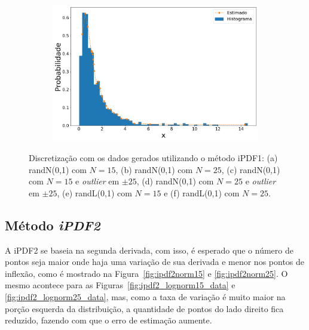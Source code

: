 \begin{figure}[H]
\begin{subfigure}[b]{0.45\textwidth}
		\includegraphics[width=\linewidth]{./figuras/iPDF1_lognormal_25_1_1000_0}
		\caption{}
		\label{fig:ipdf1_lognorm25_data}
	\end{subfigure}
	\caption{Discretização com os dados gerados utilizando o método \ac{iPDF1}: (a) randN(0,1) com $N = 15$, (b) randN(0,1) com $N = 25$, (c) randN(0,1) com $N = 15$ e \textit{outlier} em $\pm 25$, (d) randN(0,1) com $N = 25$ e \textit{outlier} em $\pm 25$, (e) randL(0,1) com $ N = 15 $ e (f) randL(0,1) com $ N = 25 $.}
	\label{fig:ipdf1_data}
\end{figure}


\subsection{Método \textit{iPDF2}}

A \ac{iPDF2} se baseia na segunda derivada, com isso, é esperado que o número de pontos seja maior onde haja uma variação de sua derivada e menor nos pontos de inflexão, como é mostrado na Figura~\ref{fig:ipdf2norm15} e \ref{fig:ipdf2norm25}. O mesmo acontece para as Figuras~\ref{fig:ipdf2_lognorm15_data} e \ref{fig:ipdf2_lognorm25_data}, mas, como a taxa de variação é muito maior na porção esquerda da distribuição, a quantidade de pontos do lado direito fica reduzido, fazendo com que o erro de estimação aumente.

